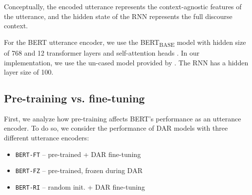 \documentclass[11pt,a4paper]{article}
\begin{document}
Conceptually, the encoded utterance represents the context-agnostic features of the utterance,
and the hidden state of the RNN represents the full discourse context.


For the BERT utterance encoder, we use the BERT\textsubscript{BASE} model with hidden size of 768 and 12 transformer layers and self-attention heads \citep[][\S3.1]{devlinBERTPretrainingDeep2018}.
In our implementation, we use the un-cased model provided by \citet{wolfHuggingFaceTransformersStateoftheart2019}.
The RNN has a hidden layer size of 100.

\subsection{Pre-training vs. fine-tuning} \label{sec:experiment2} %
First, we analyze how pre-training affects BERT's performance as an utterance encoder.
To do so, we consider the performance of DAR models with three different utterance encoders:
\begin{itemize}\setlength\itemsep{-0.5em}
  \item \texttt{BERT-FT} -- pre-trained + DAR fine-tuning 
  \item \texttt{BERT-FZ} -- pre-trained, frozen during DAR
  \item \texttt{BERT-RI} -- random init. + DAR fine-tuning 
\end{itemize}

\end{document}
